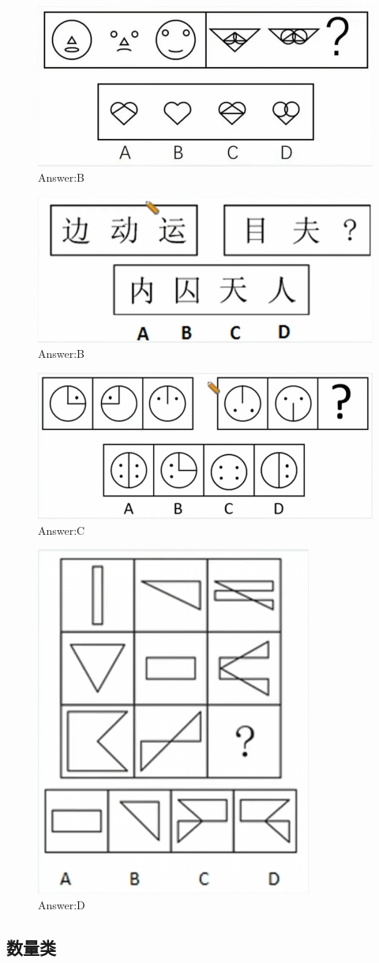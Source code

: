 \documentclass{article}
\numberwithin{equation}{section}						%
\numberwithin{figure}{section}							%
\begin{document}
\begin{sloppypar}
\begin{figure}[H]
     \centering
     \includegraphics[width=0.5\linewidth]{39.png}
		\caption{Answer:B}
\end{figure}


\begin{figure}[H]
     \centering
     \includegraphics[width=0.5\linewidth]{40.png}
		\caption{Answer:B}
\end{figure}

\begin{figure}[H]
     \centering
     \includegraphics[width=0.5\linewidth]{41.png}
		\caption{Answer:C}
\end{figure}


\begin{figure}[H]
     \centering
     \includegraphics[width=0.35\linewidth]{42.png}
		\caption{Answer:D}
\end{figure}

\subsection{数量类}


\end{sloppypar}
\end{document}

